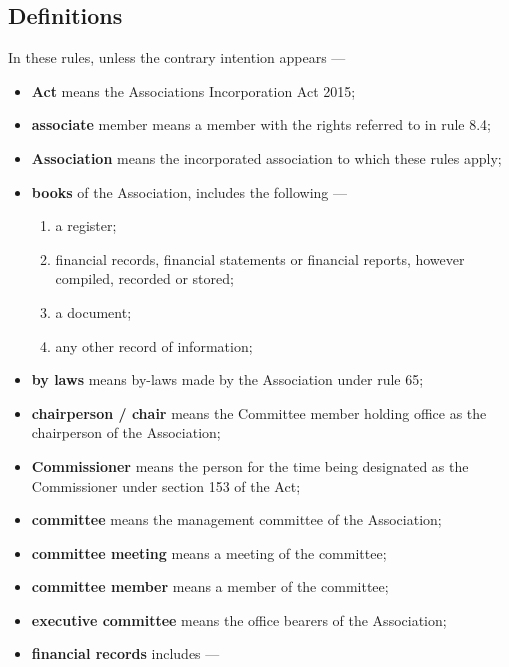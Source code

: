 \documentclass[../constitution.tex]{subfiles}
\begin{document}
\subsection{Definitions} \label{definitions}

In these rules, unless the contrary intention appears ---

\begin{itemize}[label={-}]
\item \textbf{Act} means the Associations Incorporation Act 2015;
\item \textbf{associate} member means a member with the rights referred to in rule 8.4;
\item \textbf{Association} means the incorporated association to which these rules apply;
\item \textbf{books} of the Association, includes the following ---

  \begin{enumerate}
  \def\labelenumi{\arabic{enumi}.}
  
  \item a register;
  \item financial records, financial statements or financial reports, however compiled, recorded or stored;
  \item a document;
  \item any other record of information;
  \end{enumerate}
\item \textbf{by laws} means by-laws made by the Association under rule 65;
\item \textbf{chairperson / chair} means the Committee member holding office as the chairperson of the Association;
\item \textbf{Commissioner} means the person for the time being designated as the Commissioner under section 153 of the Act;
\item \textbf{committee} means the management committee of the Association;
\item \textbf{committee meeting} means a meeting of the committee;
\item \textbf{committee member} means a member of the committee;
\item \textbf{executive committee} means the office bearers of the Association;
\item \textbf{financial records} includes ---

  \begin{enumerate}
  \def\labelenumi{\arabic{enumi}.}
  

\end{enumerate}
\end{itemize}
\end{document}
